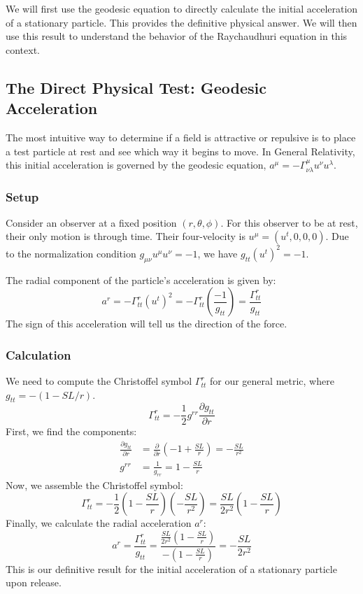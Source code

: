 \documentclass[%
  reprint,
  superscriptaddress,
  showpacs,
  showkeys,
  amsmath,amssymb,
  pra,
  longbibliography,
  floatfix,
]{revtex4-2}
\begin{document}
We will first use the geodesic equation to directly calculate the initial acceleration of a stationary particle. This provides the definitive physical answer. We will then use this result to understand the behavior of the Raychaudhuri equation in this context.

\subsection{The Direct Physical Test: Geodesic Acceleration}

The most intuitive way to determine if a field is attractive or repulsive is to place a test particle at rest and see which way it begins to move. In General Relativity, this initial acceleration is governed by the geodesic equation, $a^\mu = -\Gamma^\mu_{\nu\lambda}u^\nu u^\lambda$.

\subsubsection{Setup}
Consider an observer at a fixed position $(r, \theta, \phi)$. For this observer to be at rest, their only motion is through time. Their four-velocity is $u^\mu = (u^t, 0, 0, 0)$. Due to the normalization condition $g_{\mu\nu}u^\mu u^\nu = -1$, we have $g_{tt}(u^t)^2 = -1$.

The radial component of the particle's acceleration is given by:
\begin{equation}
a^r = -\Gamma^r_{tt} (u^t)^2 = -\Gamma^r_{tt} \left(\frac{-1}{g_{tt}}\right) = \frac{\Gamma^r_{tt}}{g_{tt}}
\end{equation}
The sign of this acceleration will tell us the direction of the force.

\subsubsection{Calculation}
We need to compute the Christoffel symbol $\Gamma^r_{tt}$ for our general metric, where $g_{tt} = -(1 - SL/r)$.
\begin{equation}
\Gamma^r_{tt} = -\frac{1}{2} g^{rr} \frac{\partial g_{tt}}{\partial r}
\end{equation}
First, we find the components:
\begin{align*}
\frac{\partial g_{tt}}{\partial r} &= \frac{\partial}{\partial r}\left(-1 + \frac{SL}{r}\right) = -\frac{SL}{r^2} \\
g^{rr} &= \frac{1}{g_{rr}} = 1 - \frac{SL}{r}
\end{align*}
Now, we assemble the Christoffel symbol:
\begin{equation}
\Gamma^r_{tt} = -\frac{1}{2} \left(1 - \frac{SL}{r}\right) \left(-\frac{SL}{r^2}\right) = \frac{SL}{2r^2}\left(1 - \frac{SL}{r}\right)
\end{equation}
Finally, we calculate the radial acceleration $a^r$:
\begin{equation}
a^r = \frac{\Gamma^r_{tt}}{g_{tt}} = \frac{\frac{SL}{2r^2}\left(1 - \frac{SL}{r}\right)}{-\left(1 - \frac{SL}{r}\right)} = -\frac{SL}{2r^2}
\end{equation}
This is our definitive result for the initial acceleration of a stationary particle upon release.
\end{document}
